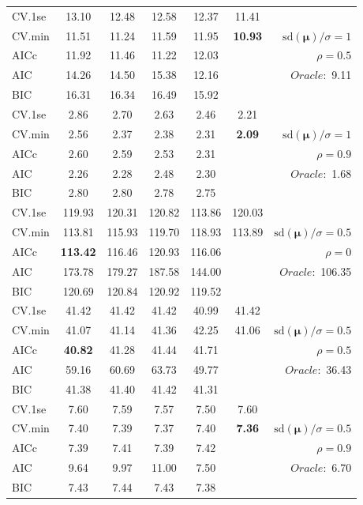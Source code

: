 \begin{table}
\begin{center}
\begin{tabular}{l*{5}{c}|r}
 \hline 
CV.1se & 13.10 & 12.48 & 12.58 & 12.37 & 11.41 & \\
CV.min & 11.51 & 11.24 & 11.59 & 11.95 & {\bf 10.93} &  $\mathrm{sd}(\mathbf{\mu})/\sigma=1$ \\
AICc & 11.92 & 11.46 & 11.22 & 12.03 & & $\rho=0.5$ \\
AIC & 14.26 & 14.50 & 15.38 & 12.16 & &  \multirow{2}{*}{$Oracle: $ 9.11} \\
BIC & 16.31 & 16.34 & 16.49 & 15.92 & &  \\
 \hline 
CV.1se & 2.86 & 2.70 & 2.63 & 2.46 & 2.21 & \\
CV.min & 2.56 & 2.37 & 2.38 & 2.31 & {\bf 2.09} &  $\mathrm{sd}(\mathbf{\mu})/\sigma=1$ \\
AICc & 2.60 & 2.59 & 2.53 & 2.31 & & $\rho=0.9$ \\
AIC & 2.26 & 2.28 & 2.48 & 2.30 & &  \multirow{2}{*}{$Oracle: $ 1.68} \\
BIC & 2.80 & 2.80 & 2.78 & 2.75 & &  \\
 \hline 
CV.1se & 119.93 & 120.31 & 120.82 & 113.86 & 120.03 & \\
CV.min & 113.81 & 115.93 & 119.70 & 118.93 & 113.89 &  $\mathrm{sd}(\mathbf{\mu})/\sigma=0.5$ \\
AICc & {\bf 113.42} & 116.46 & 120.93 & 116.06 & & $\rho=0$ \\
AIC & 173.78 & 179.27 & 187.58 & 144.00 & &  \multirow{2}{*}{$Oracle: $ 106.35} \\
BIC & 120.69 & 120.84 & 120.92 & 119.52 & &  \\
 \hline 
CV.1se & 41.42 & 41.42 & 41.42 & 40.99 & 41.42 & \\
CV.min & 41.07 & 41.14 & 41.36 & 42.25 & 41.06 &  $\mathrm{sd}(\mathbf{\mu})/\sigma=0.5$ \\
AICc & {\bf 40.82} & 41.28 & 41.44 & 41.71 & & $\rho=0.5$ \\
AIC & 59.16 & 60.69 & 63.73 & 49.77 & &  \multirow{2}{*}{$Oracle: $ 36.43} \\
BIC & 41.38 & 41.40 & 41.42 & 41.31 & &  \\
 \hline 
CV.1se & 7.60 & 7.59 & 7.57 & 7.50 & 7.60 & \\
CV.min & 7.40 & 7.39 & 7.37 & 7.40 & {\bf 7.36} &  $\mathrm{sd}(\mathbf{\mu})/\sigma=0.5$ \\
AICc & 7.39 & 7.41 & 7.39 & 7.42 & & $\rho=0.9$ \\
AIC & 9.64 & 9.97 & 11.00 & 7.50 & &  \multirow{2}{*}{$Oracle: $ 6.70} \\
BIC & 7.43 & 7.44 & 7.43 & 7.38 & &  \\
 \hline 
\end{tabular}
\end{center}
\vspace{-1cm}
\end{table}





